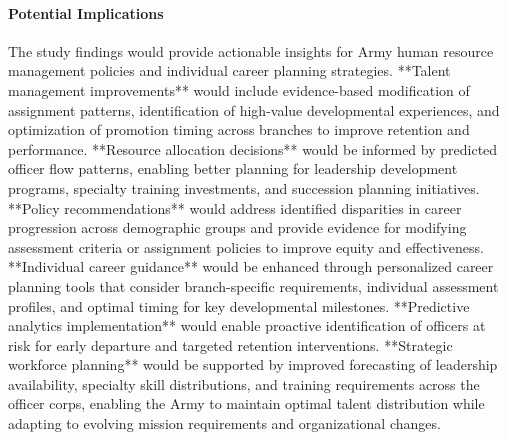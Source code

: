 \documentclass[main.tex]{subfiles}
\begin{document}
\paragraph{Potential Implications}

The study findings would provide actionable insights for Army human resource management policies and individual career planning strategies. **Talent management improvements** would include evidence-based modification of assignment patterns, identification of high-value developmental experiences, and optimization of promotion timing across branches to improve retention and performance. **Resource allocation decisions** would be informed by predicted officer flow patterns, enabling better planning for leadership development programs, specialty training investments, and succession planning initiatives. **Policy recommendations** would address identified disparities in career progression across demographic groups and provide evidence for modifying assessment criteria or assignment policies to improve equity and effectiveness. **Individual career guidance** would be enhanced through personalized career planning tools that consider branch-specific requirements, individual assessment profiles, and optimal timing for key developmental milestones. **Predictive analytics implementation** would enable proactive identification of officers at risk for early departure and targeted retention interventions. **Strategic workforce planning** would be supported by improved forecasting of leadership availability, specialty skill distributions, and training requirements across the officer corps, enabling the Army to maintain optimal talent distribution while adapting to evolving mission requirements and organizational changes.
\end{document}
